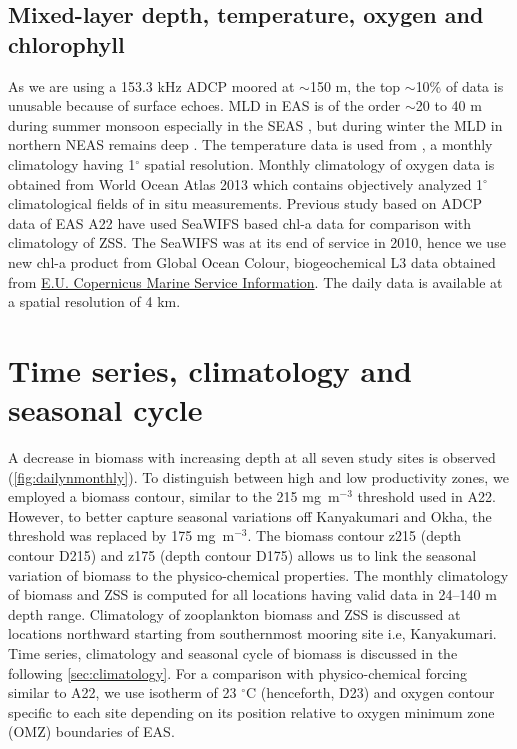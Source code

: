 \documentclass{article}
\begin{document}
	\subsection{Mixed-layer depth, temperature, oxygen and chlorophyll}
	As we are using a 153.3 kHz ADCP moored at $\sim$150 m, the top $\sim$10\% of data is unusable because of surface echoes. MLD in EAS is of the order $\sim$20 to 40 m during summer monsoon \citep{shetye1990hydrography,shankar2002hydrography,sreenivas2008monthly} especially in the SEAS \citep{shenoi2005hydrography}, but during winter the MLD in northern NEAS remains deep \citep{shankar2016inhibition}. The temperature data is used from \citet{chatterjee2012new}, a monthly climatology having 1$^{\circ}$ spatial resolution. Monthly climatology of oxygen data is obtained from World Ocean Atlas 2013 \citep{garcia2013oxygen} which contains objectively analyzed 1$^{\circ}$ climatological fields of in situ measurements. Previous study based on ADCP data of EAS A22 have used SeaWIFS based chl-a data for comparison with climatology of ZSS. The SeaWIFS was at its end of service in 2010, hence we use new chl-a product from Global Ocean Colour, biogeochemical L3 data obtained from  \href{https://doi.org/10.48670/moi-00280}{E.U. Copernicus Marine Service Information}. The daily data is available at a spatial resolution of 4 km. 
	
	\section{Time series, climatology and seasonal cycle}
	A decrease in biomass with increasing depth at all seven study sites is observed (\cref{fig:dailynmonthly}). To distinguish between high and low productivity zones, we employed a biomass contour, similar to the 215 mg~m$^{-3}$ threshold used in A22. However, to better capture seasonal variations off Kanyakumari and Okha, the threshold was replaced by 175 mg~m$^{-3}$. The biomass contour z215 (depth contour D215) and z175 (depth contour D175) allows us to link the seasonal variation of biomass to the physico-chemical properties. The monthly climatology of biomass and ZSS is computed for all locations having valid data in 24--140 m depth range. Climatology of zooplankton biomass and ZSS is discussed at locations northward starting from southernmost mooring site i.e, Kanyakumari. Time series, climatology and seasonal cycle of biomass is discussed in the following \autoref{sec:climatology}. For a comparison with physico-chemical forcing similar to A22, we use isotherm of 23 $^{\circ}$C (henceforth, D23) and oxygen contour specific to each site depending on its position relative to oxygen minimum zone (OMZ) boundaries of EAS. 
	
\end{document}
